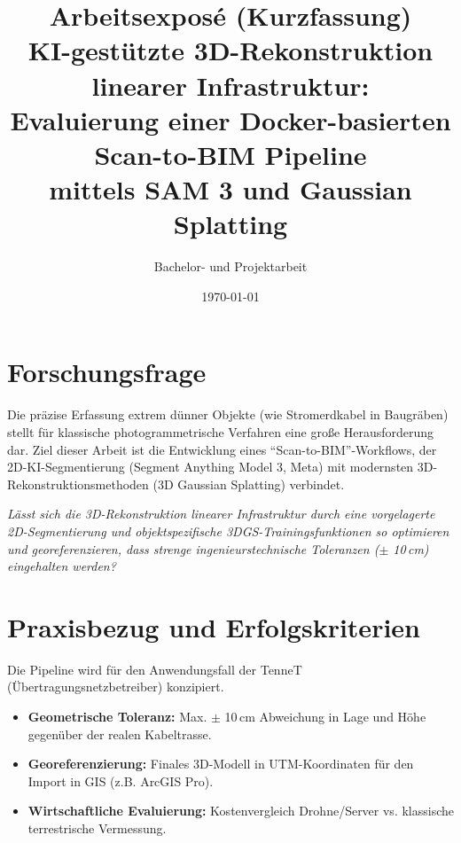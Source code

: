 \documentclass[12pt,a4paper]{article}
\title{\textbf{Arbeitsexposé (Kurzfassung)}\\KI-gestützte 3D-Rekonstruktion linearer Infrastruktur:\\Evaluierung einer Docker-basierten Scan-to-BIM Pipeline\\mittels SAM 3 und Gaussian Splatting}
\author{Bachelor- und Projektarbeit}
\date{\today}
\begin{document}
\maketitle

\section{Forschungsfrage}
Die präzise Erfassung extrem dünner Objekte (wie Stromerdkabel in Baugräben) stellt für klassische photogrammetrische Verfahren eine große Herausforderung dar. Ziel dieser Arbeit ist die Entwicklung eines ``Scan-to-BIM''-Workflows, der 2D-KI-Segmentierung (Segment Anything Model 3, Meta) mit modernsten 3D-Rekonstruktionsmethoden (3D Gaussian Splatting) verbindet.

\textit{Lässt sich die 3D-Rekonstruktion linearer Infrastruktur durch eine vorgelagerte 2D-Segmentierung und objektspezifische 3DGS-Trainingsfunktionen so optimieren und georeferenzieren, dass strenge ingenieurstechnische Toleranzen ($\pm$ 10\,cm) eingehalten werden?}

\section{Praxisbezug und Erfolgskriterien}
Die Pipeline wird für den Anwendungsfall der TenneT (Übertragungsnetzbetreiber) konzipiert.
\begin{itemize}[noitemsep]
    \item \textbf{Geometrische Toleranz:} Max. $\pm$ 10\,cm Abweichung in Lage und Höhe gegenüber der realen Kabeltrasse.
    \item \textbf{Georeferenzierung:} Finales 3D-Modell in UTM-Koordinaten für den Import in GIS (z.B. ArcGIS Pro).
    \item \textbf{Wirtschaftliche Evaluierung:} Kostenvergleich Drohne/Server vs. klassische terrestrische Vermessung.
\end{itemize}
\end{document}
